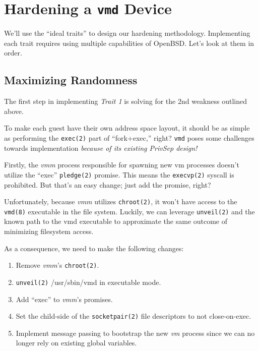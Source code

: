\documentclass[conference]{IEEEtran}
\begin{document}
\vspace{5mm}
\section{Hardening a \texttt{vmd} Device}
We'll use the ``ideal traits'' to design our hardening
methodology. Implementing each trait requires using multiple
capabilities of OpenBSD. Let's look at them in order.

\vspace{3mm}
\subsection{Maximizing Randomness}
\label{sec:randomness}
The first step in implementing \emph{Trait 1} is solving for the 2nd
weakness outlined above.

To make each guest have their own address space layout, it should be
as simple as performing the \texttt{exec(2)} part of ``fork+exec,''
right? \texttt{vmd} poses some challenges towards implementation
\emph{because of its existing PrivSep design!}

Firstly, the \emph{vmm} process responsible for spawning new vm
processes doesn't utilize the ``exec'' \texttt{pledge(2)}
promise. This means the \texttt{execvp(2)} syscall is prohibited. But
that's an easy change; just add the promise, right?

Unfortunately, because \emph{vmm} utilizes \texttt{chroot(2)}, it
won't have access to the \texttt{vmd(8)} executable in the file
system. Luckily, we can leverage \texttt{unveil(2)} and the known path
to the vmd executable to approximate the same outcome of minimizing
filesystem access.

As a consequence, we need to make the following changes:

\vspace{2mm}
\begin{enumerate}
\item Remove \emph{vmm}'s \texttt{chroot(2)}.
\item \texttt{unveil(2)} /usr/sbin/vmd in executable mode.
\item Add ``exec'' to \emph{vmm}'s promises.
\item Set the child-side of the \texttt{socketpair(2)} file
  descriptors to not close-on-exec.
\item Implement message passing to bootstrap the new \emph{vm} process
  since we can no longer rely on existing global variables.
\end{enumerate}
\vspace{2mm}
\end{document}
